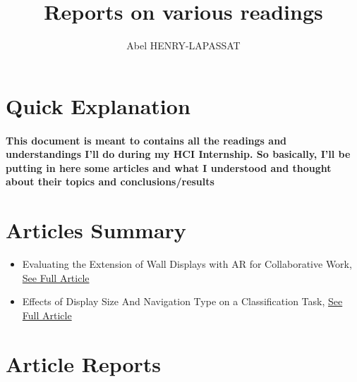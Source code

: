 \documentclass{article}
\title{Reports on various readings}
\author{Abel HENRY-LAPASSAT}
\begin{document}
\maketitle
\section{Quick Explanation}
    \paragraph{ \textnormal{This document is meant to contains all the readings and understandings I'll do during my HCI Internship.
        So basically, I'll be putting in here some articles and what I understood and thought about their topics and conclusions/results} }

\section{Articles Summary}
    \begin{itemize}
        \item Evaluating the Extension of Wall Displays with AR for Collaborative Work, \href{https://hal.science/hal-04010673/document}{See Full Article}
        \item Effects of Display Size And Navigation Type on a Classification Task, \href{https://hal.science/file/index/docid/957269/filename/chi14-classify-hal-v1.pdf}{See Full Article}
    \end{itemize}

\section{Article Reports}
    
    
\end{document}

